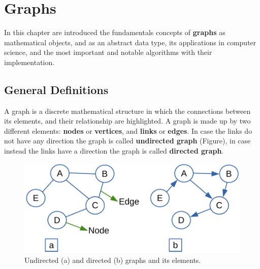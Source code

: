 \chapter{Graphs}
\label{chp:graphs}
In this chapter are introduced the fundamentals concepts of \textbf{graphs} as mathematical objects, and as an abstract data type, its applications in computer science, and the most important and notable algorithms with their implementation. 
 
\section{General Definitions}
A graph is a discrete mathematical structure in which the connections between its elements, and their relationship are highlighted. A graph is made up by two different elements: \textbf{nodes} or \textbf{vertices}, and \textbf{links} or \textbf{edges}. In case the links do not have any direction the graph is called \textbf{undirected graph} (Figure), in case instead the links have a direction the graph is called \textbf{directed graph}.

\begin{figure}[H]
	\begin{center}
		\includegraphics[scale=.6]{chapters/graphs/images/graphs_1.pdf}
		\caption[Undirected (a) and directed (b) graphs and its elements.]{Undirected (a) and directed (b) graphs and its elements.}
		\label{graphs_1}
	\end{center}
\end{figure}

